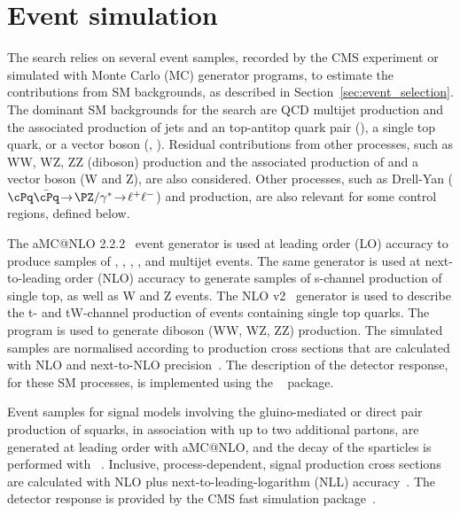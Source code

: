 \section{Event simulation}
\label{sec:event_simulation}

The search relies on several event samples, recorded by the CMS
experiment or simulated with Monte Carlo (MC) generator programs, to
estimate the contributions from SM backgrounds, as described in
Section~\ref{sec:event_selection}.
The dominant SM backgrounds for the search are QCD multijet production
and the associated production of jets and an top-antitop quark pair
(\ttbar), a single top quark, or a vector boson (\wlnu,
\znunu). Residual contributions from other processes, such as WW, WZ,
ZZ (diboson) production and the associated production of \ttbar and a
vector boson ({\ttbar}W and {\ttbar}Z), are also considered. Other
processes, such as Drell-Yan ($\cPq\bar{\cPq}\!  \rightarrow\!
\PZ/\gamma^*\!  \rightarrow\!  \ell^+\ell^-$) and \gj production, are
also relevant for some control regions, defined below.

The  aMC@NLO 2.2.2~\cite{Alwall2014} event generator is used
at leading order (LO) accuracy to produce samples of \wj, \zj, \gj,
\ttbar, and multijet events. The same generator is used at
next-to-leading order (NLO) accuracy to generate samples of s-channel
production of single top, as well as {\ttbar}W and {\ttbar}Z
events. The NLO \POWHEG v2~\cite{powheg, powheg_top_Wt} generator is
used to describe the t- and tW-channel production of events containing
single top quarks. The ~\cite{pythia} program is used to
generate diboson (WW, WZ, ZZ) production. The simulated samples are
normalised according to production cross sections that are calculated
with NLO and next-to-NLO precision~\cite{Alwall2014, wphys, fewz,
  wwxs, top++, nlotop, powheg_top_Wt}. The description of the detector
response, for these SM processes, is implemented using the
\GEANTfour~\cite{geant} package.

Event samples for signal models involving the gluino-mediated or
direct pair production of squarks, in association with up to two
additional partons, are generated at leading order with 
aMC@NLO, and the decay of the sparticles is performed with ~\cite{pythia}. Inclusive, process-dependent, signal production
cross sections are calculated with NLO plus next-to-leading-logarithm
(NLL) accuracy~\cite{Beenakker:1996ch, PhysRevLett.102.111802,
  PhysRevD.80.095004, 1126-6708-2009-12-041,
  doi:10.1142/S0217751X11053560, susynlo}. The detector response is
provided by the CMS fast simulation package~\cite{fastsim}.

